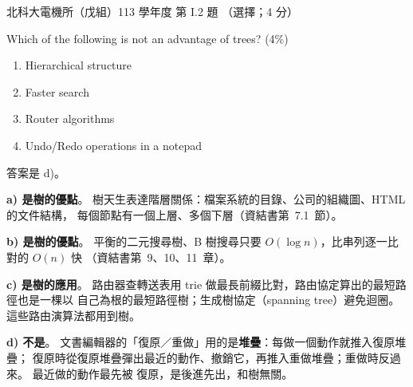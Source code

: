 \begin{pastexam}[label={px:ntut-113-ee-ds-02}]{北科大電機所（戊組）113 學年度 第 I.2 題}
（選擇；4 分）

Which of the following is not an advantage of trees? (4\%)
\begin{enumerate}[label=\alph*)]
\item Hierarchical structure
\item Faster search
\item Router algorithms
\item Undo/Redo operations in a notepad
\end{enumerate}
\end{pastexam}

\begin{pastsoln}
答案是 d)。

\textbf{a) 是樹的優點}。 樹天生表達階層關係：檔案系統的目錄、公司的組織圖、HTML 的文件結構，
每個節點有一個上層、多個下層（資結書第~7.1~節）。

\textbf{b) 是樹的優點}。 平衡的二元搜尋樹、B 樹搜尋只要 $O(\log n)$，比串列逐一比對的 $O(n)$ 快
（資結書第~9、10、11~章）。

\textbf{c) 是樹的應用}。 路由器查轉送表用 trie 做最長前綴比對，路由協定算出的最短路徑也是一棵以
自己為根的最短路徑樹；生成樹協定（spanning tree）避免迴圈。 這些路由演算法都用到樹。

\textbf{d) 不是}。 文書編輯器的「復原／重做」用的是\textbf{堆疊}：每做一個動作就推入復原堆疊；
復原時從復原堆疊彈出最近的動作、撤銷它，再推入重做堆疊；重做時反過來。 最近做的動作最先被
復原，是後進先出，和樹無關。
\end{pastsoln}
